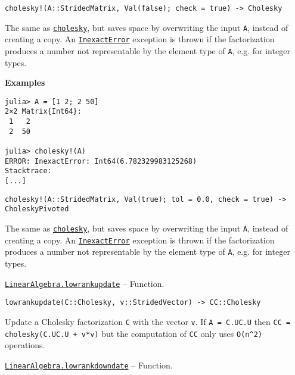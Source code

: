 \begin{adjustwidth}{2em}{0pt}


\begin{verbatim}
cholesky!(A::StridedMatrix, Val(false); check = true) -> Cholesky
\end{verbatim}

The same as \hyperlink{7653413936706994771}{\texttt{cholesky}}, but saves space by overwriting the input \texttt{A}, instead of creating a copy. An \hyperlink{5399118524830636312}{\texttt{InexactError}} exception is thrown if the factorization produces a number not representable by the element type of \texttt{A}, e.g. for integer types.

\textbf{Examples}


\begin{verbatim}
julia> A = [1 2; 2 50]
2×2 Matrix{Int64}:
 1   2
 2  50

julia> cholesky!(A)
ERROR: InexactError: Int64(6.782329983125268)
Stacktrace:
[...]
\end{verbatim}




\begin{lstlisting}
cholesky!(A::StridedMatrix, Val(true); tol = 0.0, check = true) -> CholeskyPivoted
\end{lstlisting}

The same as \hyperlink{7653413936706994771}{\texttt{cholesky}}, but saves space by overwriting the input \texttt{A}, instead of creating a copy. An \hyperlink{5399118524830636312}{\texttt{InexactError}} exception is thrown if the factorization produces a number not representable by the element type of \texttt{A}, e.g. for integer types.



\end{adjustwidth}
\hypertarget{11384711924205954768}{}
\hyperlink{11384711924205954768}{\texttt{LinearAlgebra.lowrankupdate}}  -- {Function.}

\begin{adjustwidth}{2em}{0pt}


\begin{verbatim}
lowrankupdate(C::Cholesky, v::StridedVector) -> CC::Cholesky
\end{verbatim}

Update a Cholesky factorization \texttt{C} with the vector \texttt{v}. If \texttt{A = C.U{\textquotesingle}C.U} then \texttt{CC = cholesky(C.U{\textquotesingle}C.U + v*v{\textquotesingle})} but the computation of \texttt{CC} only uses \texttt{O(n{\textasciicircum}2)} operations.



\end{adjustwidth}
\hypertarget{17556419310056499978}{}
\hyperlink{17556419310056499978}{\texttt{LinearAlgebra.lowrankdowndate}}  -- {Function.}

